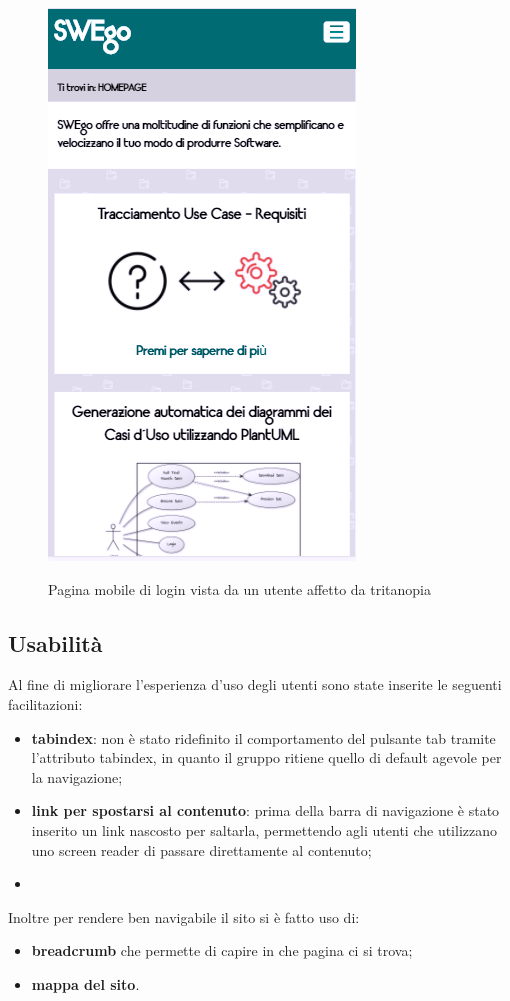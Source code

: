 	\begin{figure}
	\centering
		\includegraphics[scale=0.8]{img/tritanopia_mobile.png}\\[1cm] \caption{Pagina mobile di login vista da un utente affetto da tritanopia}
	\end{figure}
	\newpage
\subsection{Usabilità}
Al fine di migliorare l'esperienza d'uso degli utenti sono state inserite le seguenti facilitazioni:
\begin{itemize}
	\item \textbf{tabindex}: non è stato ridefinito il comportamento del pulsante tab tramite l'attributo tabindex, in quanto il gruppo ritiene quello di default agevole per la navigazione;
	\item \textbf{link per spostarsi al contenuto}: prima della barra di navigazione è stato inserito un link nascosto per saltarla, permettendo agli utenti che utilizzano uno screen reader di passare direttamente al contenuto;
	\item 
\end{itemize}
Inoltre per rendere ben navigabile il sito si è fatto uso di:
\begin{itemize}
	\item \textbf{breadcrumb} che permette di capire in che pagina ci si trova;
	\item \textbf{mappa del sito}.
\end{itemize}

